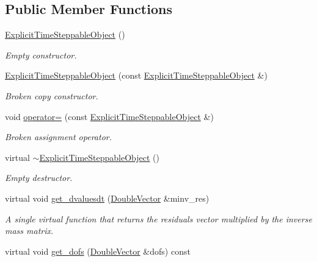 \subsection*{Public Member Functions}
\begin{DoxyCompactItemize}
\item 
\hyperlink{classoomph_1_1ExplicitTimeSteppableObject_a07e82e7df9f289fc59fbf5ac438ad068}{Explicit\+Time\+Steppable\+Object} ()
\begin{DoxyCompactList}\small\item\em Empty constructor. \end{DoxyCompactList}\item 
\hyperlink{classoomph_1_1ExplicitTimeSteppableObject_a84b73e9c12b420621c0017b989839ae5}{Explicit\+Time\+Steppable\+Object} (const \hyperlink{classoomph_1_1ExplicitTimeSteppableObject}{Explicit\+Time\+Steppable\+Object} \&)
\begin{DoxyCompactList}\small\item\em Broken copy constructor. \end{DoxyCompactList}\item 
void \hyperlink{classoomph_1_1ExplicitTimeSteppableObject_a10d44a6010c7ee70b7d1fd14fad864dc}{operator=} (const \hyperlink{classoomph_1_1ExplicitTimeSteppableObject}{Explicit\+Time\+Steppable\+Object} \&)
\begin{DoxyCompactList}\small\item\em Broken assignment operator. \end{DoxyCompactList}\item 
virtual \hyperlink{classoomph_1_1ExplicitTimeSteppableObject_a0ed68ad4da79ddfdc5b545fa62292304}{$\sim$\+Explicit\+Time\+Steppable\+Object} ()
\begin{DoxyCompactList}\small\item\em Empty destructor. \end{DoxyCompactList}\item 
virtual void \hyperlink{classoomph_1_1ExplicitTimeSteppableObject_ab1e7d8d7ec548b26ed039b61a9eba9c4}{get\+\_\+dvaluesdt} (\hyperlink{classoomph_1_1DoubleVector}{Double\+Vector} \&minv\+\_\+res)
\begin{DoxyCompactList}\small\item\em A single virtual function that returns the residuals vector multiplied by the inverse mass matrix. \end{DoxyCompactList}\item 
virtual void \hyperlink{classoomph_1_1ExplicitTimeSteppableObject_a0fcf43487590dd723f25184067f26219}{get\+\_\+dofs} (\hyperlink{classoomph_1_1DoubleVector}{Double\+Vector} \&dofs) const

\end{DoxyCompactItemize}
